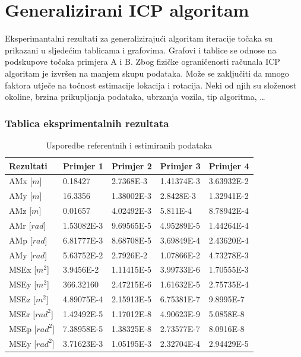 \section{Generalizirani ICP algoritam}
Eksperimantalni rezultati za generalizirajući algoritam iteracije točaka su prikazani u sljedećim tablicama i grafovima. Grafovi i tablice se odnose na podskupove točaka primjera A i B. Zbog fizičke ograničenosti računala ICP algoritam je izvršen na manjem skupu podataka. Može se zaključiti da mnogo faktora utječe na točnost estimacije lokacija i rotacija. Neki od njih su složenost okoline, brzina prikupljanja podataka, ubrzanja vozila, tip algoritma, \dots

\subsubsection{Tablica eksprimentalnih rezultata}
\begin{table}[H]
  \centering
  \begin{tabular}{ |p{3cm}| |p{2cm}|p{2cm}|p{2cm}|p{2cm}| }
    \hline
    Rezultati& Primjer 1& Primjer 2&Primjer 3& Primjer 4\\
    \hline
    AMx [$m$]& 0.18427& 2.7368E-3& 1.41374E-3& 3.63932E-2\\
    AMy [$m$]&  16.3356& 1.38002E-3& 2.8428E-3& 1.32941E-2\\
    AMz [$m$]& 0.01657& 4.02492E-3& 5.811E-4& 8.78942E-4\\
    AMr [$rad$]& 1.53082E-3& 9.69565E-5& 4.95289E-5& 1.44264E-4\\
    AMp [$rad$]& 6.81777E-3& 8.68708E-5& 3.69849E-4& 2.43620E-4\\
    AMy [$rad$]& 5.63752E-2& 2.7926E-2& 1.07866E-2& 4.73278E-3\\
    \hline
    MSEx [$m^2$]& 3.9456E-2& 1.11415E-5& 3.99733E-6& 1.70555E-3\\
    MSEy [$m^2$]& 366.32160& 2.47215E-6& 1.61632E-5& 2.75735E-4\\
    MSEz [$m^2$]& 4.89075E-4& 2.15913E-5& 6.75381E-7& 9.8995E-7\\
    MSEr [$rad^2$]& 1.42492E-5& 1.17012E-8& 4.90623E-9& 5.0858E-8\\
    MSEp [$rad^2$]& 7.38958E-5& 1.38325E-8& 2.73577E-7& 8.0916E-8\\
    MSEy [$rad^2$]& 3.71623E-3& 1.05195E-3& 2.32704E-4& 2.94429E-5\\
    \hline
  \end{tabular}
  \caption{Usporedbe referentnih i estimiranih podataka}
  \label{res:ref_est_table}
\end{table}
\pagebreak
